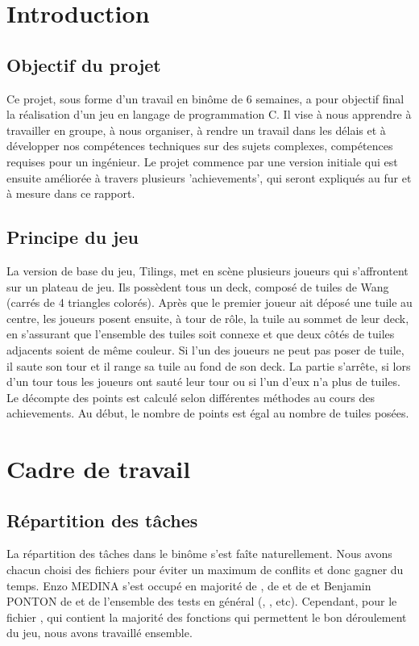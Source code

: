 \documentclass[a4paper]{article}
\begin{document}
\tableofcontents

\newpage

\section{Introduction}


\subsection{Objectif du projet}
Ce projet, sous forme d'un travail en binôme de 6 semaines, a pour objectif final la réalisation d'un jeu en langage de programmation C. Il vise à nous apprendre à travailler en groupe, à nous organiser, à rendre un travail dans les délais et à développer nos compétences techniques sur des sujets complexes, compétences requises pour un ingénieur. Le projet commence par une version initiale qui est ensuite améliorée à travers plusieurs 'achievements', qui seront expliqués au fur et à mesure dans ce rapport.

\subsection{Principe du jeu}
La version de base du jeu, Tilings, met en scène plusieurs joueurs qui s'affrontent sur un plateau de jeu. Ils possèdent tous un deck, composé de tuiles de Wang (carrés de 4 triangles colorés). Après que le premier joueur ait déposé une tuile au centre, les joueurs posent ensuite, à tour de rôle, la tuile au sommet de leur deck, en s'assurant que l'ensemble des tuiles soit connexe et que deux côtés de tuiles adjacents soient de même couleur. Si l'un des joueurs ne peut pas poser de tuile, il saute son tour et il range sa tuile au fond de son deck. La partie s'arrête, si lors d'un tour tous les joueurs ont sauté leur tour ou si l'un d'eux n'a plus de tuiles. Le décompte des points est calculé selon différentes méthodes au cours des achievements. Au début, le nombre de points est égal au nombre de tuiles posées.

\section{Cadre de travail}

\subsection{Répartition des tâches}
La répartition des tâches dans le binôme s'est faîte naturellement. Nous avons chacun choisi des fichiers pour éviter un maximum de conflits et donc gagner du temps. Enzo MEDINA s'est occupé en majorité de , de  et de  et Benjamin PONTON de  et de l'ensemble des tests en général (, , etc). Cependant, pour le fichier , qui contient la majorité des fonctions qui permettent le bon déroulement du jeu, nous avons travaillé ensemble.
\end{document}
